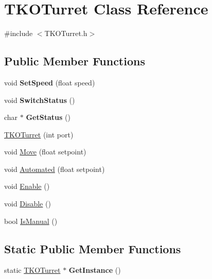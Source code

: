 \hypertarget{class_t_k_o_turret}{\section{T\-K\-O\-Turret Class Reference}
\label{class_t_k_o_turret}
}


{\ttfamily \#include $<$T\-K\-O\-Turret.\-h$>$}

\subsection*{Public Member Functions}
\begin{DoxyCompactItemize}
\item 
\hypertarget{class_t_k_o_turret_a7b94773cc4841e70f8d83a37804e4177}{void {\bfseries Set\-Speed} (float speed)}\label{class_t_k_o_turret_a7b94773cc4841e70f8d83a37804e4177}

\item 
\hypertarget{class_t_k_o_turret_a32318777a75e5a315f9fc04c84e49bf2}{void {\bfseries Switch\-Status} ()}\label{class_t_k_o_turret_a32318777a75e5a315f9fc04c84e49bf2}

\item 
\hypertarget{class_t_k_o_turret_a372478ac57ff02da1300830ca822c9f5}{char $\ast$ {\bfseries Get\-Status} ()}\label{class_t_k_o_turret_a372478ac57ff02da1300830ca822c9f5}

\item 
\hyperlink{class_t_k_o_turret_a8a4082b539c656705750570a6f06c232}{T\-K\-O\-Turret} (int port)
\item 
void \hyperlink{class_t_k_o_turret_a367b7dc5ca0648a363f6b475f1704556}{Move} (float setpoint)
\item 
void \hyperlink{class_t_k_o_turret_ae967823e31817fdacc8f5e2526f53b0c}{Automated} (float setpoint)
\item 
void \hyperlink{class_t_k_o_turret_aadf4bbca5ea49fbec7d883e7ac802072}{Enable} ()
\item 
void \hyperlink{class_t_k_o_turret_a9e35ec3866de6ee39e486a7cf623b47d}{Disable} ()
\item 
bool \hyperlink{class_t_k_o_turret_a8f32f133eb847d29784e6a2b341d90e1}{Is\-Manual} ()
\end{DoxyCompactItemize}
\subsection*{Static Public Member Functions}
\begin{DoxyCompactItemize}
\item 
\hypertarget{class_t_k_o_turret_a32ae6fbc7bb1fe2e5946e48b9acd9013}{static \hyperlink{class_t_k_o_turret}{T\-K\-O\-Turret} $\ast$ {\bfseries Get\-Instance} ()}\label{class_t_k_o_turret_a32ae6fbc7bb1fe2e5946e48b9acd9013}

\end{DoxyCompactItemize}



